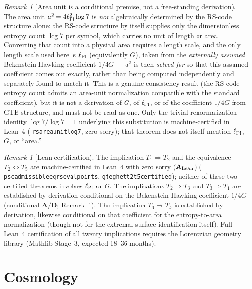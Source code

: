 \documentclass[11pt]{article}
\theoremstyle{remark}
\newtheorem{remark}[theorem]{Remark}
\newcommand{\lean}[1]{%
  \penalty-100
  \begingroup\def\_{\textunderscore\allowbreak}\texttt{#1}\endgroup}
\newcommand{\lPl}{\ell_{\rm Pl}}
\newcommand{\CatAL}{\ensuremath{\textbf{A}_{\rm Lean}}}
\newcommand{\CatAD}{\textbf{A/D}}
\begin{document}
\begin{remark}[Area unit is a conditional premise, not a free-standing derivation]
\label{rem:area_unit}
The area unit $a^2 = 4\lPl^2\log 7$ is \emph{not} algebraically determined by the
RS-code structure alone: the RS-code structure by itself supplies only the
dimensionless entropy count $\log 7$ per symbol, which carries no unit of length or
area.  Converting that count into a physical area requires a length scale, and the
only length scale used here is $\lPl$ (equivalently $G$), taken from the
\emph{externally assumed} Bekenstein-Hawking coefficient $1/4G$ --- $a^2$ is then
\emph{solved for} so that this assumed coefficient comes out exactly, rather than
being computed independently and separately found to match it.  This is a genuine
consistency result (the RS-code entropy count admits an area-unit normalization
compatible with the standard coefficient), but it is not a derivation of $G$, of
$\lPl$, or of the coefficient $1/4G$ from GTE structure, and must not be read as
one.  Only the trivial renormalization identity $\log 7/\log 7=1$ underlying this
substitution is machine-certified in Lean~4 (\lean{rs\_area\_unit\_log7}, zero sorry);
that theorem does not itself mention $\lPl$, $G$, or ``area.''
\end{remark}

\begin{remark}[Lean certification]
\label{rem:ghet_lean}
The implication $T_1\Rightarrow T_2$ and the equivalence $T_2\Leftrightarrow T_5$ are machine-certified
in Lean~4 with zero sorry ($\CatAL$) (\lean{psc\_admissible\_eq\_rs\_eval\_points},
\lean{gte\_ghet\_t2\_t5\_certified}); neither of these two certified theorems involves
$\lPl$ or $G$.
The implications $T_2\Rightarrow T_3$ and $T_3\Rightarrow T_1$ are established by
derivation conditional on the Bekenstein-Hawking coefficient $1/4G$ (conditional
$\CatAD$; Remark~\ref{rem:area_unit}).
The implication $T_4\Rightarrow T_3$ is established by derivation, likewise conditional
on that coefficient for the entropy-to-area normalization (though not for the
extremal-surface identification itself).
Full Lean~4 certification of all twenty implications
requires the Lorentzian geometry library (Mathlib Stage~3, expected 18--36 months).
\end{remark}

\section{Cosmology}
\label{sec:cosmo}
\end{document}
